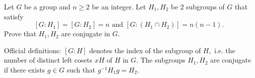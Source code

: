 Let \(G\) be a group and \(n \ge 2\) be an integer. Let \(H_1, H_2\) be \(2\) subgroups of \(G\) that satisfy \[[G: H_1] = [G: H_2] = n \text{ and } [G: (H_1 \cap H_2)] = n(n-1).\]Prove that \(H_1, H_2\) are conjugate in \(G.\)

Official definitions: \([G:H]\) denotes the index of the subgroup of \(H,\) i.e. the number of distinct left cosets \(xH\) of \(H\) in \(G.\) The subgroups \(H_1, H_2\) are conjugate if there exists \(g \in G\) such that \(g^{-1} H_1 g = H_2.\)